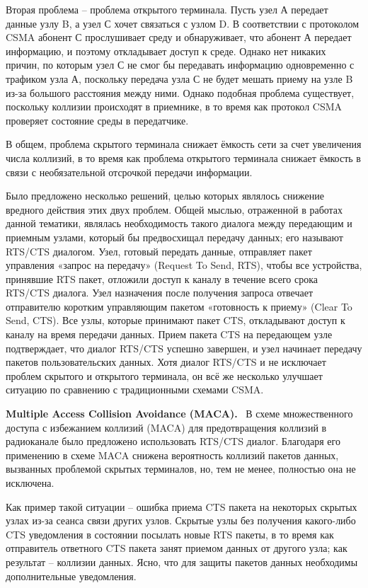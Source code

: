 \documentclass[14pt,a4paper,titlepage]{extarticle}
\renewcommand{\paragraph}[1]{\textbf{#1.}~}
\begin{document}
Вторая проблема -- проблема открытого терминала. Пусть узел А передает данные узлу B, а узел С хочет связаться с узлом D. В соответствии с протоколом CSMA абонент С прослушивает среду и обнаруживает, что абонент А передает информацию, и поэтому откладывает доступ к среде. Однако нет никаких причин, по которым узел С не смог бы передавать информацию одновременно с трафиком узла А, поскольку передача узла С не будет мешать приему на узле B из-за большого расстояния между ними. Однако подобная проблема существует, поскольку коллизии происходят в приемнике, в то время как протокол CSMA проверяет состояние среды в передатчике. 

В общем, проблема скрытого терминала снижает ёмкость сети за счет увеличения числа коллизий, в то время как проблема открытого терминала снижает ёмкость в связи с необязательной отсрочкой передачи информации.

Было предложено несколько решений, целью которых являлось снижение вредного действия этих двух проблем. Общей мыслью, отраженной в работах данной тематики, являлась необходимость такого диалога между передающим и приемным узлами, который бы предвосхищал передачу данных; его называют RTS/CTS диалогом.
Узел, готовый передать данные, отправляет пакет управления «запрос на передачу» (Request To Send, RTS), чтобы все устройства, принявшие RTS пакет, отложили доступ к каналу в течение всего срока RTS/CTS диалога. Узел назначения после получения запроса отвечает отправителю коротким управляющим пакетом «готовность к приему» (Clear To Send, CTS). Все узлы, которые принимают пакет CTS, откладывают доступ к каналу на время передачи данных. Прием пакета CTS на передающем узле подтверждает, что диалог RTS/CTS успешно завершен, и узел начинает передачу пакетов пользовательских данных. Хотя диалог RTS/CTS и не исключает проблем скрытого и открытого терминала, он всё же несколько улучшает ситуацию по сравнению с традиционными схемами CSMA. 

\paragraph{Multiple Access Collision Avoidance (MACA)}
В схеме множественного доступа с избежанием коллизий (MACA) для предотвращения коллизий в радиоканале было предложено использовать RTS/CTS диалог. Благодаря его применению в схеме MACA снижена вероятность коллизий пакетов данных, вызванных проблемой скрытых терминалов, но, тем не менее, полностью она не исключена.
 
Как пример такой ситуации -- ошибка приема CTS пакета на некоторых скрытых узлах из-за сеанса связи других узлов. Скрытые узлы без получения какого-либо CTS уведомления в состоянии посылать новые RTS пакеты, в то время как отправитель ответного CTS пакета занят приемом данных от другого узла; как результат -- коллизии данных. Ясно, что для защиты пакетов данных необходимы дополнительные уведомления. 
\end{document}
